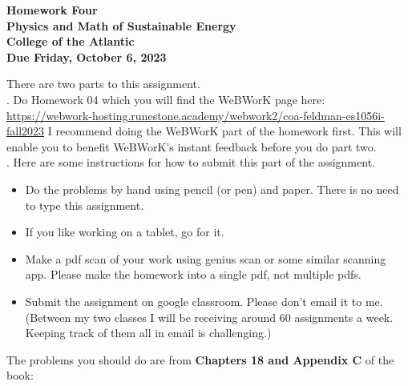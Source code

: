 \documentclass[12pt]{article}
\begin{document}
\pagestyle{empty}
 
\begin{center}
{\LARGE {\bf Homework Four}}\\
\bigskip
{\Large {\bf Physics and Math of Sustainable Energy}}\\
\bigskip
{\Large {\bf College of the Atlantic}}\\
\bigskip
{ {\bf Due Friday, October 6, 2023}}\\ 
\end{center}
\medskip


\noindent There are two parts to this assignment.\\

.  Do Homework 04 which you
will find the WeBWorK page here:
\url{https://webwork-hosting.runestone.academy/webwork2/coa-feldman-es1056i-fall2023}
I recommend doing the WeBWorK part of the homework first.  This will
enable you to benefit WeBWorK's instant feedback before you do part
two.\\ 


.  Here are some
instructions for how to submit this part of the assignment.
\begin{itemize}
\item Do the problems by hand using pencil (or pen) and paper.
  There is no need to type this assignment.
\item If you like working on a tablet, go for it. 
\item Make a pdf scan of your work using genius scan or some
  similar scanning app.  Please make the homework into a single
  pdf, not multiple pdfs.
\item Submit the assignment on google classroom.  Please don't
  email it to me.  (Between my two classes I will be receiving
  around 60 assignments a week.  Keeping track of them all in email 
  is challenging.)\\
\end{itemize}



\noindent The problems you should do are from {\bf Chapters 18 and
  Appendix C} of the book:  \\
\end{document}
